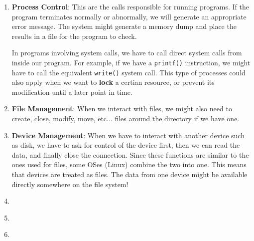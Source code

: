 \documentclass{tufte-handout}
\begin{document}
\begin{enumerate}
	\item \textbf{Process Control}: This are the calls responsible for running 
			programs. If the program terminates normally or abnormally, we will
			generate an appropriate error message. The system might generate a 
			memory dump and place the results in a file for the program to check.

			In programs involving system calls, we have to call direct system calls
			from inside our program. For example, if we have a \texttt{printf()} 
			instruction, we might have to call the equivalent \texttt{write()}
			system call. This type of processes could also apply when we want to 
			\textbf{lock} a certian resource, or prevent its modification until 
			a later point in time.

	\item \textbf{File Management}: When we interact with files, we might also need 
			to create, close, modify, move, etc... files around the directory 
			if we have one.
	\item \textbf{Device Management}: When we have to interact with another device
			such as disk, we have to ask for control of the device first, then
			we can read the data, and finally close the connection. Since these
			functions are similar to the ones used for files, some OSes (Linux) 
			combine the two into one. This means that devices are treated as files.
			The data from one device might be available directly somewhere on the 
			file system!
	\item \textbf{}
	\item \textbf{}
	\item \textbf{}
\end{enumerate}
\end{document}
